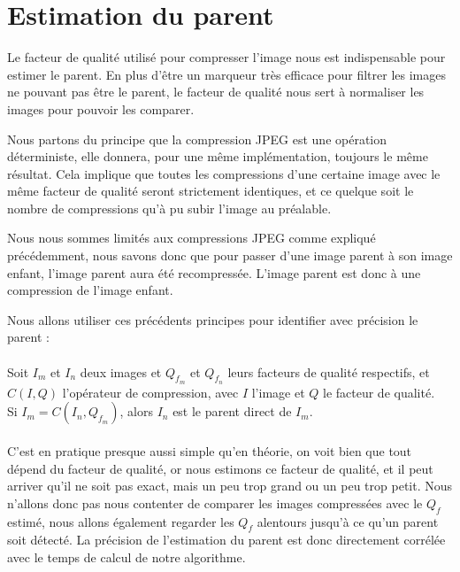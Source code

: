 \documentclass[utf8,final]{stageM2R} %
\begin{document}
\section{Estimation du parent}
\label{sec:parent}
Le facteur de qualité utilisé pour compresser l'image nous est indispensable pour estimer le parent. En plus d'être un marqueur très efficace pour filtrer les images ne pouvant pas être le parent, le facteur de qualité nous sert à normaliser les images pour pouvoir les comparer.

Nous partons du principe que la compression JPEG est une opération déterministe, elle donnera, pour une même implémentation, toujours le même résultat. Cela implique que toutes les compressions d'une certaine image avec le même facteur de qualité seront strictement identiques, et ce quelque soit le nombre de compressions qu'à pu subir l'image au préalable.

Nous nous sommes limités aux compressions JPEG comme expliqué précédemment, nous savons donc que pour passer d'une image parent à son image enfant, l'image parent aura été recompressée. L'image parent est donc à une compression de l'image enfant.

Nous allons utiliser ces précédents principes pour identifier avec précision le parent : 
\paragraph{}

Soit $I_m$ et $I_n$ deux images et $Q_{f_{m}}$ et $Q_{f_{n}}$ leurs facteurs de qualité respectifs, et $C(I,Q)$ l'opérateur de compression, avec $I$ l'image et $Q$ le facteur de qualité.
\\
Si $I_m = C(I_n, Q_{f_{m}})$, alors $I_n$ est le parent direct de $I_m$.
\paragraph{}

C'est en pratique presque aussi simple qu'en théorie, on voit bien que tout dépend du facteur de qualité, or nous estimons ce facteur de qualité, et il peut arriver qu'il ne soit pas exact, mais un peu trop grand ou un peu trop petit. Nous n'allons donc pas nous contenter de comparer les images compressées avec le $Q_f$ estimé, nous allons également regarder les $Q_f$ alentours jusqu'à ce qu'un parent soit détecté. La précision de l'estimation du parent est donc directement corrélée avec le temps de calcul de notre algorithme. 
\end{document}
